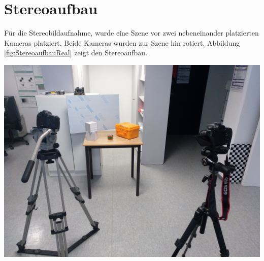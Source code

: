 %
%
%
%
%
%


\section{Stereoaufbau}


Für die Stereobildaufnahme, wurde eine Szene vor zwei nebeneinander platzierten Kameras platziert. Beide Kameras wurden zur Szene hin rotiert. Abbildung \ref{fig:StereoaufbauReal} zeigt den Stereoaufbau.\\



\begin{minipage}{\linewidth}
	\centering
	\includegraphics[width=.7\linewidth]{images/SetUpSameResolution.jpg}
	\label{fig:StereoaufbauReal}
\end{minipage}\\

